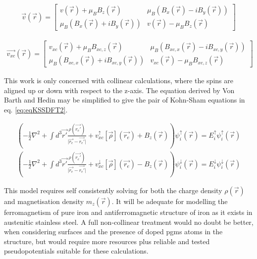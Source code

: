 \begin{equation}
\begin{split}
\vec{v}(\vec{r}) = \begin{bmatrix} v(\vec{r}) + \mu_B B_z(\vec{r}) & \mu_B (B_x(\vec{r}) - i B_y(\vec{r})) \\ \mu_B (B_x(\vec{r}) + i B_y(\vec{r})) & v(\vec{r}) - \mu_B B_z(\vec{r}) \end{bmatrix}
\label{eq:sdftpotential}
\end{split}
\end{equation}

\begin{equation}
\begin{split}
\vec{v_{xc}}(\vec{r}) = \begin{bmatrix} v_{xc}(\vec{r}) + \mu_B B_{xc, z}(\vec{r}) & \mu_B (B_{xc, x}(\vec{r}) - i B_{xc, y}(\vec{r})) \\ \mu_B (B_{xc, x}(\vec{r}) + i B_{xc, y}(\vec{r})) & v_{xc}(\vec{r}) - \mu_B B_{xc, z}(\vec{r}) \end{bmatrix}
\label{eq:sdftpotentialxc}
\end{split}
\end{equation}

This work is only concerned with collinear calculations, where the spins are aligned up or down with respect to the z-axis.  The equation derived by Von Barth and Hedin may be simplified to give the pair of Kohn-Sham equations in eq. \ref{eq:eqKSSDFT2}.

\begin{equation}
\begin{split}
\left(-\frac{1}{2} \nabla^2  + \int d^3\vec{r'} \frac{\rho(\vec{r_{e}'})}{\lvert \vec{r_{e}} - \vec{r_{e}'} \rvert} + v^{\uparrow}_{xc}[\vec{\rho}](\vec{r_{e}}) + B_{z}(\vec{r}) \right)\psi^{\uparrow}_{i}(\vec{r}) = E^{\uparrow}_i \psi^{\uparrow}_{i}(\vec{r})  \\
\left(-\frac{1}{2} \nabla^2  + \int d^3\vec{r'} \frac{\rho(\vec{r_{e}'})}{\lvert \vec{r_{e}} - \vec{r_{e}'} \rvert} + v^{\downarrow}_{xc}[\vec{\rho}](\vec{r_{e}}) - B_{z}(\vec{r}) \right)\psi^{\downarrow}_{i}(\vec{r}) = E^{\downarrow}_i \psi^{\downarrow}_{i}(\vec{r})
\label{eq:eqKSSDFT2}
\end{split}
\end{equation}

This model requires self consistently solving for both the charge density $\rho(\vec{r})$ and magnetisation density $m_{z}(\vec{r})$.  It will be adequate for modelling the ferromagnetism of pure iron and antiferromagnetic structure of iron as it exists in austenitic stainless steel.  A full non-collinear treatment would no doubt be better, when considering surfaces and the presence of doped \acrshort{pgm}s atoms in the structure, but would require more resources plus reliable and tested pseudopotentials suitable for these calculations.




